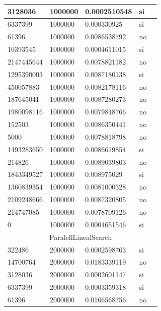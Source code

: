 \documentclass[12pt, fleqn]{article}                             %
\theoremstyle{break}                                            %
\begin{document}
\begin{longtable}{|m{5em}|m{5em}|m{10em}|m{5em}|@{}m{0pt}@{}}
            3128036& 1000000  & 0.0002510548 & si &\\[1em]    \hline
            6337399& 1000000  & 0.000330925 & si &\\[1em]    \hline
            61396& 1000000  & 0.0086538792 & no &\\[1em]    \hline
            10393545& 1000000  & 0.0004611015 & si &\\[1em]    \hline
            2147445644& 1000000  & 0.0078821182 & no &\\[1em]    \hline
            1295390003& 1000000  & 0.0087180138 & si &\\[1em]    \hline
            450057883& 1000000  & 0.0082178116 & no &\\[1em]    \hline
            187645041& 1000000  & 0.0087280273 & no &\\[1em]    \hline
            1980098116& 1000000  & 0.0079848766 & no &\\[1em]    \hline
            152503& 1000000  & 0.0086350441 & no &\\[1em]    \hline
            5000& 1000000  & 0.0078818798 & no &\\[1em]    \hline
            1493283650& 1000000  & 0.0086619854 & si &\\[1em]    \hline
            214826& 1000000  & 0.0089039803 & no &\\[1em]    \hline
            1843349527& 1000000  & 0.008975029 & si &\\[1em]    \hline
            1360839354& 1000000  & 0.0081000328 & no &\\[1em]    \hline
            2109248666& 1000000  & 0.0087320805 & no &\\[1em]    \hline
            214747085& 1000000  & 0.0078709126 & no &\\[1em]    \hline
            0& 1000000  & 0.0004651546 & si &\\[1em]    \hline
            \multicolumn{5}{|c|}{ParalellLinealSearch}   \\          \hline
            322486& 2000000  & 0.0002598763 & si &\\[1em]    \hline
            14700764& 2000000  & 0.0183339119 & no &\\[1em]    \hline
            3128036& 2000000  & 0.0002601147 & si &\\[1em]    \hline
            6337399& 2000000  & 0.0003359318 & si &\\[1em]    \hline
            61396& 2000000  & 0.0166568756 & no &\\[1em]    \hline

\end{longtable}
\end{document}
